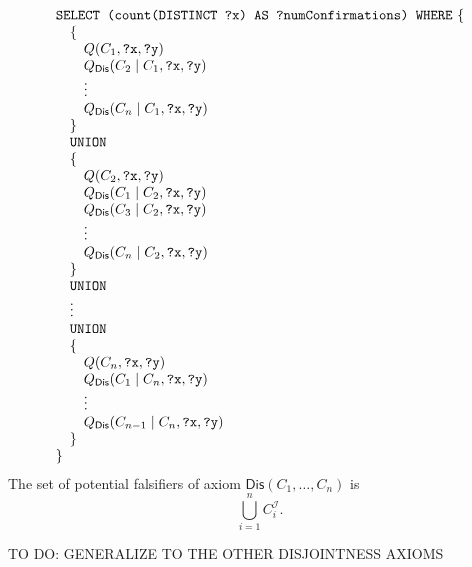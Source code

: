 \documentclass[a4paper]{article}
\newcounter{ex}
\begin{document}
\begin{equation}
  \begin{minipage}[c]{5in}
    \begin{tabbing}
      \quad\=\quad\=\quad\=\kill
      \texttt{SELECT (count(DISTINCT ?x) AS ?numConfirmations) WHERE} \{\\
      \>\{\\
      \>\>$Q(C_1, \mbox{\tt ?x}, \mbox{\tt ?y})$\\
      \>\>$Q_{\mathsf{Dis}}(C_2 \mid C_1, \mbox{\tt ?x}, \mbox{\tt ?y})$\\
      \>\>$\vdots$\\
      \>\>$Q_{\mathsf{Dis}}(C_n \mid C_1, \mbox{\tt ?x}, \mbox{\tt ?y})$\\
      \>\}\\
      \>\texttt{UNION}\\
      \>\{\\
      \>\>$Q(C_2, \mbox{\tt ?x}, \mbox{\tt ?y})$\\
      \>\>$Q_{\mathsf{Dis}}(C_1 \mid C_2, \mbox{\tt ?x}, \mbox{\tt ?y})$\\
      \>\>$Q_{\mathsf{Dis}}(C_3 \mid C_2, \mbox{\tt ?x}, \mbox{\tt ?y})$\\
      \>\>$\vdots$\\
      \>\>$Q_{\mathsf{Dis}}(C_n \mid C_2, \mbox{\tt ?x}, \mbox{\tt ?y})$\\
      \>\}\\
      \>\texttt{UNION}\\
      \>$\vdots$\\
      \>\texttt{UNION}\\
      \>\{\\
      \>\>$Q(C_n, \mbox{\tt ?x}, \mbox{\tt ?y})$\\
      \>\>$Q_{\mathsf{Dis}}(C_1 \mid C_n, \mbox{\tt ?x}, \mbox{\tt ?y})$\\
      \>\>$\vdots$\\
      \>\>$Q_{\mathsf{Dis}}(C_{n - 1} \mid C_n, \mbox{\tt ?x}, \mbox{\tt ?y})$\\
      \>\}\\
      \}
    \end{tabbing}
  \end{minipage}
\end{equation}
The set of potential falsifiers of axiom $\mathsf{Dis}(C_1, \ldots, C_n)$ is
\[
  \bigcup_{i = 1}^n C_i^\mathcal{I}.
\]


\bigskip

TO DO: GENERALIZE TO THE OTHER DISJOINTNESS AXIOMS
\end{document}
